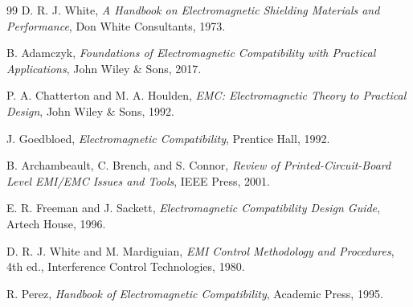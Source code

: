 \documentclass[11pt,a4paper]{article}
\begin{document}
\begin{thebibliography}{99}
 D. R. J. White, \textit{A Handbook on Electromagnetic Shielding Materials and Performance}, Don White Consultants, 1973.

 B. Adamczyk, \textit{Foundations of Electromagnetic Compatibility with Practical Applications}, John Wiley \& Sons, 2017.

 P. A. Chatterton and M. A. Houlden, \textit{EMC: Electromagnetic Theory to Practical Design}, John Wiley \& Sons, 1992.

 J. Goedbloed, \textit{Electromagnetic Compatibility}, Prentice Hall, 1992.

 B. Archambeault, C. Brench, and S. Connor, \textit{Review of Printed-Circuit-Board Level EMI/EMC Issues and Tools}, IEEE Press, 2001.

 E. R. Freeman and J. Sackett, \textit{Electromagnetic Compatibility Design Guide}, Artech House, 1996.

 D. R. J. White and M. Mardiguian, \textit{EMI Control Methodology and Procedures}, 4th ed., Interference Control Technologies, 1980.

 R. Perez, \textit{Handbook of Electromagnetic Compatibility}, Academic Press, 1995.

\end{thebibliography}
\end{document}
